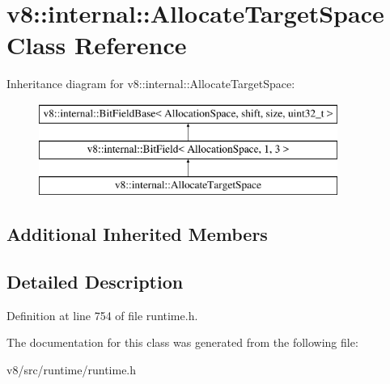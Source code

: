 \hypertarget{classv8_1_1internal_1_1AllocateTargetSpace}{}\section{v8\+:\+:internal\+:\+:Allocate\+Target\+Space Class Reference}
\label{classv8_1_1internal_1_1AllocateTargetSpace}
Inheritance diagram for v8\+:\+:internal\+:\+:Allocate\+Target\+Space\+:\begin{figure}[H]
\begin{center}
\leavevmode
\includegraphics[height=3.000000cm]{classv8_1_1internal_1_1AllocateTargetSpace}
\end{center}
\end{figure}
\subsection*{Additional Inherited Members}


\subsection{Detailed Description}


Definition at line 754 of file runtime.\+h.



The documentation for this class was generated from the following file\+:\begin{DoxyCompactItemize}
\item 
v8/src/runtime/runtime.\+h\end{DoxyCompactItemize}
